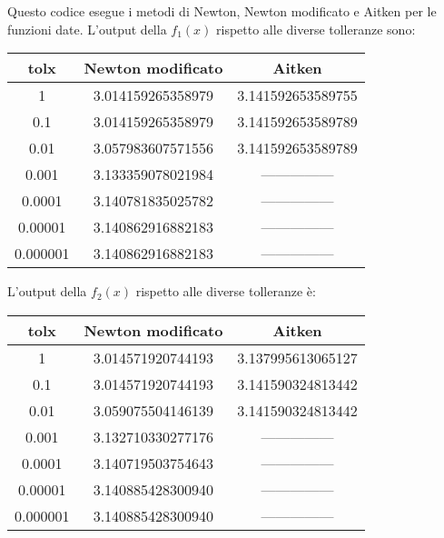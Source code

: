 
Questo codice esegue i metodi di Newton, Newton modificato e Aitken per le funzioni date. \newline
L'output della $f_{1}(x)$ rispetto alle diverse tolleranze sono:

\begin{center}
\begin{tabular}{c|c|c}
tolx & Newton modificato & Aitken \\
\hline
1 & 3.014159265358979 & 3.141592653589755 \\
0.1 & 3.014159265358979 & 3.141592653589789 \\
0.01 & 3.057983607571556 & 3.141592653589789 \\
0.001 & 3.133359078021984 & --------------- \\ 
0.0001 & 3.140781835025782 & --------------- \\
0.00001 & 3.140862916882183 & --------------- \\
0.000001 & 3.140862916882183 & --------------- \\
\end{tabular}
\end{center}

L'output della \(f_{2}(x)\) rispetto alle diverse tolleranze è: \newline

\begin{center}
\begin{tabular}{c|c|c}
tolx & Newton modificato & Aitken \\
\hline
1 & 3.014571920744193 & 3.137995613065127 \\
0.1 & 3.014571920744193 & 3.141590324813442 \\
0.01 & 3.059075504146139 & 3.141590324813442 \\
0.001 & 3.132710330277176 & --------------- \\ 
0.0001 & 3.140719503754643 & --------------- \\
0.00001 & 3.140885428300940 & --------------- \\
0.000001 & 3.140885428300940 & --------------- \\
\end{tabular} \\
\end{center}